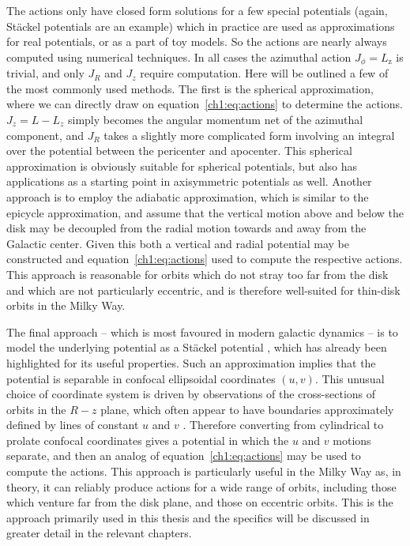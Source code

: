The actions only have closed form solutions for a few special potentials (again, St\"{a}ckel potentials are an example) which in practice are used as approximations for real potentials, or as a part of toy models. So the actions are nearly always computed using numerical techniques. In all cases the azimuthal action $J_{\phi} = L_\mathrm{z}$ is trivial, and only $J_{R}$ and $J_{z}$ require computation. Here will be outlined a few of the most commonly used methods. The first is the spherical approximation, where we can directly draw on equation~\ref{ch1:eq:actions} to determine the actions. $J_{z} = L - L_{z}$ simply becomes the angular momentum net of the azimuthal component, and $J_{R}$ takes a slightly more complicated form involving an integral over the potential between the pericenter and apocenter. This spherical approximation is obviously suitable for spherical potentials, but also has applications as a starting point in axisymmetric potentials as well. Another approach is to employ the adiabatic approximation, which is similar to the epicycle approximation, and assume that the vertical motion above and below the disk may be decoupled from the radial motion towards and away from the Galactic center. Given this both a vertical and radial potential may be constructed and equation~\ref{ch1:eq:actions} used to compute the respective actions. This approach is reasonable for orbits which do not stray too far from the disk and which are not particularly eccentric, and is therefore well-suited for thin-disk orbits in the Milky Way.

The final approach -- which is most favoured in modern galactic dynamics -- is to model the underlying potential as a St\"{a}ckel potential \parencite{binney12}, which has already been highlighted for its useful properties. Such an approximation implies that the potential is separable in confocal ellipsoidal coordinates $(u,v)$. This unusual choice of coordinate system is driven by observations of the cross-sections of orbits in the $R-z$ plane, which often appear to have boundaries approximately defined by lines of constant $u$ and $v$ \parencite[see figure 3.27 in ][]{binney08}. Therefore converting from cylindrical to prolate confocal coordinates gives a potential in which the $u$ and $v$ motions separate, and then an analog of equation~\eqref{ch1:eq:actions} may be used to compute the actions. This approach is particularly useful in the Milky Way as, in theory, it can reliably produce actions for a wide range of orbits, including those which venture far from the disk plane, and those on eccentric orbits. This is the approach primarily used in this thesis and the specifics will be discussed in greater detail in the relevant chapters.

